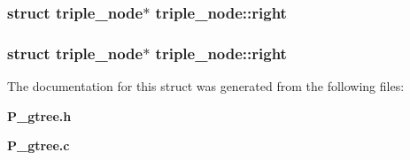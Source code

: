 \subsubsection{\setlength{\rightskip}{0pt plus 5cm}struct triple\_\-node$\ast$ triple\_\-node::right}\label{structtriple__node_m8}


\subsubsection{\setlength{\rightskip}{0pt plus 5cm}struct triple\_\-node$\ast$ triple\_\-node::right}\label{structtriple__node_m3}




The documentation for this struct was generated from the following files:\begin{CompactItemize}
\item 
{\bf P\_\-gtree.h}\item 
{\bf P\_\-gtree.c}\end{CompactItemize}
